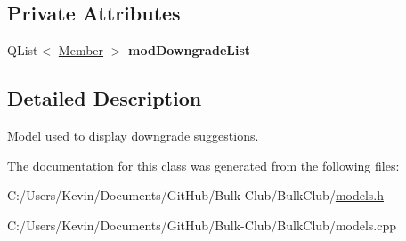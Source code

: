 \subsection*{Private Attributes}
\begin{DoxyCompactItemize}
\item 
\mbox{\label{class_downgrade_model_a7b029f7089d799db33ffcd42b1a8d733}} 
Q\+List$<$ \mbox{\hyperlink{class_member}{Member}} $>$ {\bfseries mod\+Downgrade\+List}
\end{DoxyCompactItemize}


\subsection{Detailed Description}
Model used to display downgrade suggestions. 

The documentation for this class was generated from the following files\+:\begin{DoxyCompactItemize}
\item 
C\+:/\+Users/\+Kevin/\+Documents/\+Git\+Hub/\+Bulk-\/\+Club/\+Bulk\+Club/\mbox{\hyperlink{models_8h}{models.\+h}}\item 
C\+:/\+Users/\+Kevin/\+Documents/\+Git\+Hub/\+Bulk-\/\+Club/\+Bulk\+Club/models.\+cpp\end{DoxyCompactItemize}
